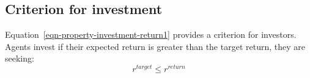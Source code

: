 \subsection{Criterion for investment}
Equation~\ref{eqn-property-investment-return1} provides a criterion for investors. Agents invest if  their expected return is greater than the target return, they are seeking:
\begin{equation}
r^{target}\le r^{return} 
\label{eqn-property-investment-return2}
\end{equation}
%
%
% 
